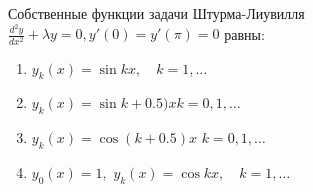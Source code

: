 Собственные функции задачи Штурма-Лиувилля \(\frac{d^2y}{dx^2}+\lambda y =0, y'\left(0\right)=y'\left(\pi \right) =0\) равны:

\begin{enumerate}[label=\arabic*)]
    \item \(y_k\left(x\right)=\sin kx,\quad k=1,\dots\)
    \item \(y_k\left(x\right)=\sin k+0.5)x k=0,1,\dots\)
    \item \(y_k\left(x\right)=\cos (k+0.5)x\) \(k=0,1,\dots\)
    \item \(y_0\left(x\right)=1,\) \(y_k\left(x\right)=\cos kx,\quad k=1,\dots\)
\end{enumerate}

